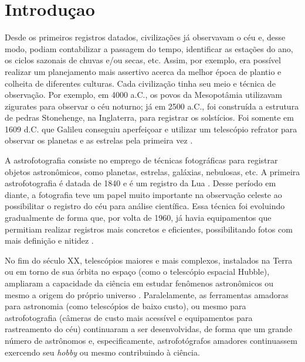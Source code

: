 \chapter{Introduçao}

Desde os primeiros registros datados, civilizações já observavam o céu e, desse modo, podiam contabilizar a passagem do tempo, identificar as estações do ano, os ciclos sazonais de chuvas e/ou secas, etc. Assim, por exemplo, era possível realizar um planejamento mais assertivo acerca da melhor época de plantio e colheita de diferentes culturas. Cada civilização tinha seu meio e técnica de observação. Por exemplo, em 4000 a.C., os povos da Mesopotâmia utilizavam zigurates para observar o céu noturno; já em 2500 a.C., foi construída a estrutura de pedras Stonehenge, na Inglaterra, para registrar os solstícios. Foi somente em 1609 d.C. que Galileu conseguiu aperfeiçoar e utilizar um telescópio refrator para observar os planetas e as estrelas pela primeira vez \cite{site:brescolaAstrofoto}.

A astrofotografia consiste no emprego de técnicas fotográficas para registrar objetos astronômicos, como planetas, estrelas, galáxias, nebulosas, etc. A primeira astrofotografia é datada de 1840 e é um registro da Lua \cite{site:introCabau}. Desse período em diante, a fotografia teve um papel muito importante na observação celeste ao possibilitar o registro do céu para análise científica. Essa técnica foi evoluindo gradualmente de forma que, por volta de 1960, já havia equipamentos que permitiam realizar registros mais concretos e eficientes, possibilitando fotos com mais definição e nitidez \cite{site:importanciaAstroftoSantos}.

No fim do século XX, telescópios maiores e mais complexos, instalados na Terra ou em torno de sua órbita no espaço (como o telescópio espacial Hubble), ampliaram a capacidade da ciência em estudar fenômenos astronômicos ou mesmo a origem do próprio universo \cite{site:importanciaAstroftoSantos}.
Paralelamente, as ferramentas amadoras para astronomia (como telescópios de baixo custo), ou mesmo para astrofotografia (câmeras de custo mais acessível e equipamentos para rastreamento do céu) continuaram a ser desenvolvidas, de forma que um grande número de astrônomos e, especificamente, astrofotógrafos amadores continuassem exercendo seu \textit{hobby} ou mesmo contribuindo à ciência.

